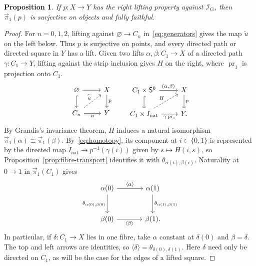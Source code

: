 \documentclass[12pt,a4paper]{amsart}
\newtheorem{proposition}[theorem]{Proposition}
\theoremstyle{definition}
\renewcommand{\vec}{\overrightarrow}
\newcommand{\I}{\mathcal I_{\mathrm G}}
\newcommand{\rev}[1]{#1_{\mathrm{nat}}}
\newcommand{\Iv}{\rev{I}}
\newcommand{\cube}[1]{C_{#1}}
\newcommand{\PiC}{\vec{\pi}_1}
\newcommand{\clp}[1]{\langle #1\rangle}
\begin{document}
\begin{proposition}\label{prop:lifts}
If $p\colon X\to Y$ has the right lifting property against $\I$, then $\PiC(p)$ is surjective on objects and fully faithful.
\end{proposition}
\begin{proof}
For $n=0,1,2$, lifting against $\varnothing\to\cube n$ in~\eqref{eq:generators} gives the map $\widetilde u$ on the left below. Thus $p$ is surjective on points, and every directed path or directed square in $Y$ has a lift. Given two lifts $\alpha,\beta\colon\cube1\to X$ of a directed path $\gamma\colon\cube1\to Y$, lifting against the strip inclusion gives $H$ on the right, where $\operatorname{pr}_1$ is projection onto $\cube1$.
\begin{equation}\label{eq:cube-strip-lifts}
\begin{tikzcd}
 \varnothing\ar[r]\ar[d,hook]&X\ar[d,"p"]\\
 \cube{n}\ar[r,"u"']\ar[ur,dashed,"\widetilde u"]&Y
\end{tikzcd}
\qquad
\begin{tikzcd}
 \cube{1}\times \mathsf{S}^0\ar[r,"{(\alpha,\beta)}"]\ar[d,hook]&X\ar[d,"p"]\\
 \cube{1}\times\Iv\ar[r,"\gamma\operatorname{pr}_1"']\ar[ur,dashed,"H"]&Y .
\end{tikzcd}
\end{equation}
By Grandis's invariance theorem, $H$ induces a natural isomorphism $\PiC(\alpha)\cong\PiC(\beta)$. By~\eqref{eq:homotopy}, its component at $i\in\{0,1\}$ is represented by the directed map $\Iv\to p^{-1}(\gamma(i))$ given by $s\mapsto H(i,s)$, so Proposition~\ref{prop:fibre-transport} identifies it with $\theta_{\alpha(i),\beta(i)}$. Naturality at $0\to1$ in $\PiC(\cube1)$ gives
\begin{equation}\label{eq:lift-comparison}
\begin{tikzcd}[column sep=large,row sep=large]
 \alpha(0)\ar[r,"\clp{\alpha}"]\ar[d,"{\theta_{\alpha(0),\beta(0)}}"']&
 \alpha(1)\ar[d,"{\theta_{\alpha(1),\beta(1)}}"]\\
 \beta(0)\ar[r,"\clp{\beta}"']&\beta(1).
\end{tikzcd}
\end{equation}
In particular, if $\delta\colon\cube1\to X$ lies in one fibre, take $\alpha$ constant at $\delta(0)$ and $\beta=\delta$. The top and left arrows are identities, so $\clp{\delta}=\theta_{\delta(0),\delta(1)}$. Here $\delta$ need only be directed on $\cube1$, as will be the case for the edges of a lifted square.


\end{proof}
\end{document}
